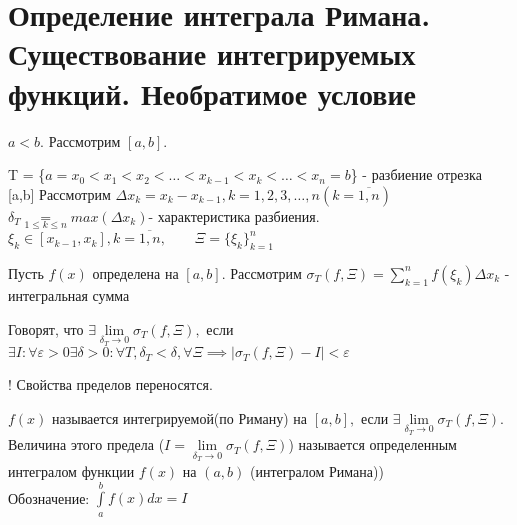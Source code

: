 \documentclass[../main.tex]{subfiles}
\begin{document}
\section{Определение интеграла Римана. Существование интегрируемых функций. Необратимое условие}

\noindent $a<b$. Рассмотрим $[a,b]$. 
\begin{minipage}{0.5\textwidth}
    \begin{flushright}
    \end{flushright}
\end{minipage}

T = \{$a=x_{0}<x_{1}<x_{2}<\dots<x_{k-1}<x_{k}<\dots<x_{n}=b$\} - разбиение отрезка [a,b]  
Рассмотрим $\Delta x_{k}=x_{k}-x_{k-1},k=1,2,3,\dots,n(k=\overline{1,n})$\\ 
$\delta_{T}\underset{1\leqslant k \leqslant n}{=} max(\Delta x_{k})$- характеристика разбиения. \\ 
$\xi_{k} \in [x_{k-1},x_{k}],k=\overline{1,n},\qquad \Xi=\{\xi_{k}\}_{k=1}^{n} $
\vspace{0.5cm}

\noindent Пусть $f(x)$ определена на $[a,b]$. Рассмотрим $\displaystyle \sigma_{T}(f,\Xi)=\sum_{k=1}^{n} f(\xi_{k})\Delta x_{k}$ - интегральная сумма

\begin{definition}
    Говорят, что $\exists \lim\limits_{\delta_{T}\to 0} \sigma_{T}(f,\Xi), $ если $\exists I:\forall \varepsilon >0 \exists \delta>0: \forall T,\delta_{T}<\delta,\forall \Xi \implies |\sigma_{T}(f,\Xi)-I|<\varepsilon$
\end{definition}
! Свойства пределов переносятся.
\begin{definition}
    $f(x) $ называется интегрируемой(по Риману) на $[a,b],$ если $\exists \lim\limits_{\delta_{T}\to 0}\sigma_{T}(f,\Xi).$ Величина этого предела ($I=\lim\limits_{\delta_{T}\to 0} \sigma_{T}(f,\Xi) $) называется определенным интегралом функции $f(x)$ на $(a,b)$ (интегралом Римана))\\ 
    Обозначение: $\displaystyle \int\limits_{a}^{b}f(x)dx=I$
\end{definition}
\end{document}

